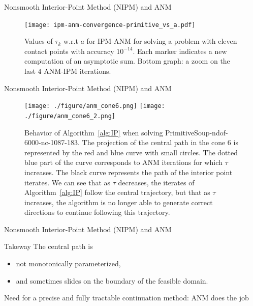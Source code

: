 \begin{frame}{Nonsmooth Interior-Point Method (NIPM) and ANM}
\begin{figure}[htbp]
  \begin{center}
    \texttt{[image: ipm-anm-convergence-primitive\_vs\_a.pdf]}
\caption{Values of $\tau_k$ w.r.t $a$ for IPM-ANM for solving a problem with eleven contact points with accuracy $10^{-14}$. Each marker indicates a new computation of an asymptotic sum. Bottom graph: a zoom on the last $4$ ANM-IPM iterations.}
\label{tau2t_vs_a}
\end{center}
\end{figure}
\end{frame}
\begin{frame}{Nonsmooth Interior-Point Method (NIPM) and ANM}
  \begin{figure}[htbp]
  \begin{center}
    \texttt{[image: ./figure/anm\_cone6.png]}
    \texttt{[image: ./figure/anm\_cone6\_2.png]}
\caption{Behavior of Algorithm~\ref{alg:IP} when solving PrimitiveSoup-ndof-6000-nc-1087-183. The projection of the central path in the cone 6 is represented by the red and blue curve with small circles. The dotted blue part of the curve corresponds to ANM iterations for which $\tau$ increases. The black curve represents the path of the interior point iterates. We can see that as $\tau$ decreases, the iterates of Algorithm~\ref{alg:IP} follow the central trajectory, but that as $\tau$ increases, the algorithm is no longer able to generate correct directions to continue following this trajectory.}
\label{anm_cone6}
\end{center}
\end{figure}
\end{frame}
\begin{frame}{Nonsmooth Interior-Point Method (NIPM) and ANM}
\begin{block}{Takeway}
  The central path is
  \begin{itemize}
  \item  not monotonically parameterized, 
  \item  and sometimes slides on the boundary of the feasible domain.
  \end{itemize}

   Need for a precise and fully tractable continuation method: ANM does the job
\end{block}
\end{frame}



